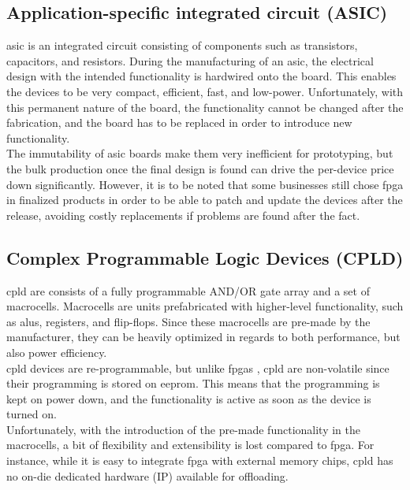 \subsection{Application-specific integrated circuit (ASIC)}
\gls{asic} is an integrated circuit consisting of components such as
transistors, capacitors, and resistors. During the manufacturing of an
\gls{asic}, the electrical design with the intended functionality is hardwired
onto the board. This enables the devices to be very compact, efficient, fast,
and low-power. Unfortunately, with this permanent nature of the board, the
functionality cannot be changed after the fabrication, and the board has to be
replaced in order to introduce new functionality\cite{fpga_for_dummies}.\\
The immutability of \gls{asic} boards make them very inefficient for
prototyping, but the bulk production once the final design is found can drive
the per-device price down significantly. However, it is to be noted that
some businesses still chose \gls{fpga} in finalized products in order to be
able to patch and update the devices after the release, avoiding costly
replacements if problems are found after the fact.\cite{fpga_for_dummies}


\subsection{Complex Programmable Logic Devices (CPLD)}
\gls{cpld} are consists of a fully programmable AND/OR gate array and a set of
macrocells. Macrocells are units prefabricated with higher-level functionality,
such as \gls{alu}s, registers, and flip-flops. Since these macrocells are
pre-made by the manufacturer, they can be heavily optimized in regards to both
performance, but also power efficiency.\cite{xilinx_cpld}\\
\gls{cpld} devices are re-programmable, but unlike \gls{fpga}s
, \gls{cpld} are
non-volatile since their programming is stored on \gls{eeprom}. This means that
the programming is kept on power down, and the functionality is active as soon
as the device is turned on\cite{xilinx_cpld}.\\
Unfortunately, with the introduction of the pre-made functionality in the
macrocells, a bit of flexibility and extensibility is lost compared to
\gls{fpga}. For instance, while it is easy to integrate \gls{fpga} with
external memory chips, \gls{cpld} has no on-die dedicated hardware (IP)
available for offloading\cite{numatolab_cpld_vs_fpga}.

